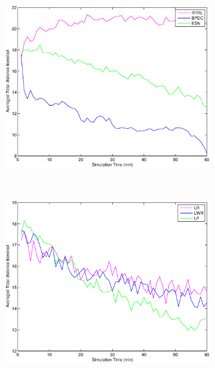 \documentclass[msc,ai,logo]{infthesis}
\begin{document}
\begin{figure}[H]
        \centering
        \begin{subfigure}[b]{0.49\columnwidth}
                \centering
                \includegraphics[width=\columnwidth]{RNN_00_DIST.eps}
              \label{fig:RNN_00_DIST}  
        \end{subfigure}%
        ~ %
        \begin{subfigure}[b]{0.49\columnwidth}
                \centering
                \includegraphics[width=\columnwidth]{LR_00_DIST.eps}

\end{subfigure}
\end{figure}
\end{document}

